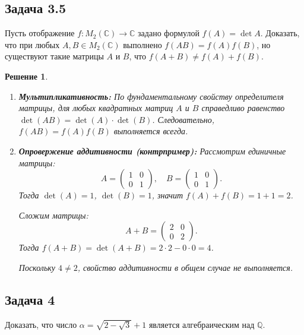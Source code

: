 \documentclass[14pt]{article}
\newtheorem*{solution}{Решение}
\begin{document}
	\subsection*{Задача 3.5}
	Пусть отображение $f: M_2(\mathbb{C}) \to \mathbb{C}$ задано формулой $f(A) = \det A$. Доказать, что при любых $A, B \in M_2(\mathbb{C})$ выполнено $f(AB) = f(A)f(B)$, но существуют такие матрицы $A$ и $B$, что $f(A + B) \neq f(A) + f(B)$.
	
	\begin{solution}
		\begin{enumerate}
			\item \textbf{Мультипликативность:} По фундаментальному свойству определителя матрицы, для любых квадратных матриц $A$ и $B$ справедливо равенство $\det(AB) = \det(A) \cdot \det(B)$. Следовательно, $f(AB) = f(A)f(B)$ выполняется всегда.
			
			\item \textbf{Опровержение аддитивности (контрпример):}
			Рассмотрим единичные матрицы:
			\[
			A = \begin{pmatrix} 1 & 0 \\ 0 & 1 \end{pmatrix}, \quad B = \begin{pmatrix} 1 & 0 \\ 0 & 1 \end{pmatrix}.
			\]
			Тогда $\det(A) = 1$, $\det(B) = 1$, значит $f(A) + f(B) = 1 + 1 = 2$.
			
			Сложим матрицы:
			\[
			A + B = \begin{pmatrix} 2 & 0 \\ 0 & 2 \end{pmatrix}.
			\]
			Тогда $f(A + B) = \det(A + B) = 2 \cdot 2 - 0 \cdot 0 = 4$.
			
			Поскольку $4 \neq 2$, свойство аддитивности в общем случае не выполняется.
		\end{enumerate}
	\end{solution}
	
	\subsection*{Задача 4}
	Доказать, что число $\alpha = \sqrt{2 - \sqrt{3}} + 1$ является алгебраическим над $\mathbb{Q}$.
	
\end{document}
